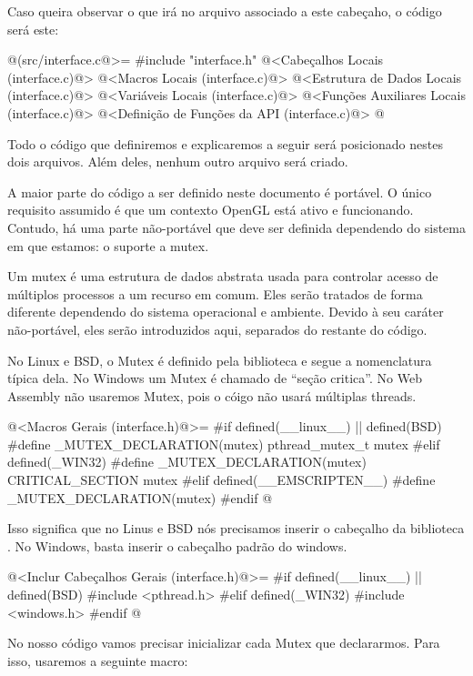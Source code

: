 Caso queira observar o que irá no arquivo 
associado a este cabeçaho, o código será este:

\iniciocodigo
@(src/interface.c@>=
#include "interface.h"
@<Cabeçalhos Locais (interface.c)@>
@<Macros Locais (interface.c)@>
@<Estrutura de Dados Locais (interface.c)@>
@<Variáveis Locais (interface.c)@>
@<Funções Auxiliares Locais (interface.c)@>
@<Definição de Funções da API (interface.c)@>
@
\fimcodigo

Todo o código que definiremos e explicaremos a seguir será posicionado
nestes dois arquivos. Além deles, nenhum outro arquivo será criado.


A maior parte do código a ser definido neste documento é portável. O
único requisito assumido é que um contexto OpenGL está ativo e
funcionando. Contudo, há uma parte não-portável que deve ser definida
dependendo do sistema em que estamos: o suporte a mutex.

Um mutex é uma estrutura de dados abstrata usada para controlar acesso
de múltiplos processos a um recurso em comum. Eles serão tratados de
forma diferente dependendo do sistema operacional e ambiente. Devido à
seu caráter não-portável, eles serão introduzidos aqui, separados do
restante do código.

No Linux e BSD, o Mutex é definido pela biblioteca
 e segue a nomenclatura típica dela. No Windows um
Mutex é chamado de ``seção critica''. No Web Assembly não usaremos
Mutex, pois o cóigo não usará múltiplas threads.

\iniciocodigo
@<Macros Gerais (interface.h)@>=
#if defined(__linux__) || defined(BSD)
#define _MUTEX_DECLARATION(mutex) pthread_mutex_t mutex
#elif defined(_WIN32)
#define _MUTEX_DECLARATION(mutex) CRITICAL_SECTION mutex
#elif defined(__EMSCRIPTEN__)
#define _MUTEX_DECLARATION(mutex)
#endif
@
\fimcodigo

Isso significa que no Linus e BSD nós precisamos inserir o cabeçalho
da biblioteca . No Windows, basta inserir o
cabeçalho padrão do windows.

\iniciocodigo
@<Inclur Cabeçalhos Gerais (interface.h)@>=
#if defined(__linux__) || defined(BSD)
#include <pthread.h>
#elif defined(_WIN32)
#include <windows.h>
#endif
@
\fimcodigo

No nosso código vamos precisar inicializar cada Mutex que
declararmos. Para isso, usaremos a seguinte macro:

